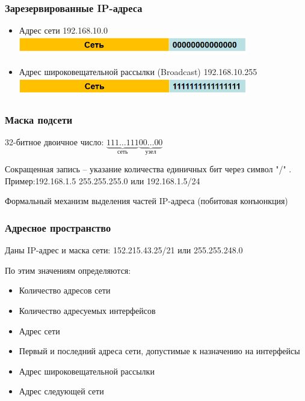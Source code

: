 \begin{frame}[t]
\frametitle{Зарезервированные IP-адреса}
\begin{itemize}
	\item Адрес сети 192.168.10.0 \\
	\includegraphics[width=10cm]{images/it_4}
\item Адрес широковещательной рассылки (Broadcast) 192.168.10.255 \\
\includegraphics[width=10cm]{images/it_5}

\end{itemize}


\end{frame}

\begin{frame}[t]
\frametitle{Маска подсети}
32-битное двоичное число: $\underbrace{111\ldots111}_{сеть}\underbrace{00\ldots00}_{узел}$

Сокращенная запись – указание количества единичных бит через символ "/" .
Пример:192.168.1.5 255.255.255.0 или 192.168.1.5/24

Формальный механизм выделения частей IP-адреса (побитовая конъюнкция)


\end{frame}

\begin{frame}[t]
\frametitle{Адресное пространство}
Даны IP-адрес и маска сети: 152.215.43.25/21 или 255.255.248.0

По этим значениям определяются:
\begin{itemize}
	\item Количество адресов сети
	\item Количество адресуемых интерфейсов
	\item Адрес сети
	\item Первый и последний адреса сети, допустимые к назначению  на интерфейсы
	\item Адрес широковещательной рассылки
	\item Адрес следующей сети

\end{itemize}



\end{frame}

